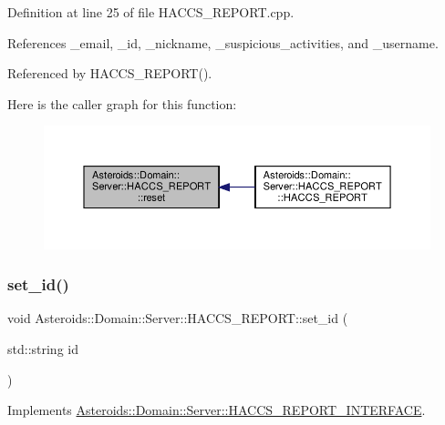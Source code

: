 Definition at line 25 of file H\+A\+C\+C\+S\+\_\+\+R\+E\+P\+O\+R\+T.\+cpp.



References \+\_\+email, \+\_\+id, \+\_\+nickname, \+\_\+suspicious\+\_\+activities, and \+\_\+username.



Referenced by H\+A\+C\+C\+S\+\_\+\+R\+E\+P\+O\+R\+T().

Here is the caller graph for this function\+:\nopagebreak
\begin{figure}[H]
\begin{center}
\leavevmode
\includegraphics[width=350pt]{classAsteroids_1_1Domain_1_1Server_1_1HACCS__REPORT_a8ac70a5b53e7c93a8cefd963c35f3efa_icgraph}
\end{center}
\end{figure}
\mbox{\label{classAsteroids_1_1Domain_1_1Server_1_1HACCS__REPORT_afd4fb5bff2bc5e2de54bdf5c56d17ce7}} 
\subsubsection{\texorpdfstring{set\+\_\+id()}{set\_id()}}
{\footnotesize\ttfamily void Asteroids\+::\+Domain\+::\+Server\+::\+H\+A\+C\+C\+S\+\_\+\+R\+E\+P\+O\+R\+T\+::set\+\_\+id (\begin{DoxyParamCaption}\item[{std\+::string}]{id }\end{DoxyParamCaption})\hspace{0.3cm}{\ttfamily [virtual]}}



Implements \hyperlink{classAsteroids_1_1Domain_1_1Server_1_1HACCS__REPORT__INTERFACE_a3c7f14b37674ab2849164e7b990ea7bf}{Asteroids\+::\+Domain\+::\+Server\+::\+H\+A\+C\+C\+S\+\_\+\+R\+E\+P\+O\+R\+T\+\_\+\+I\+N\+T\+E\+R\+F\+A\+CE}.



